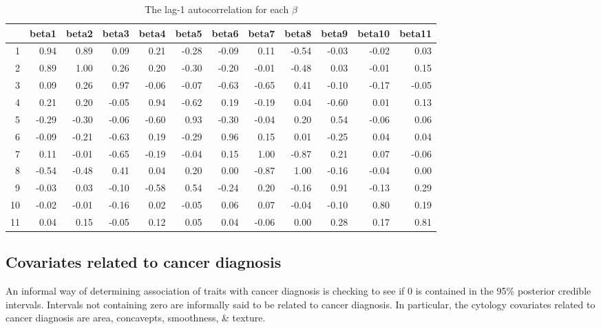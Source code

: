 \documentclass[11pt]{amsart}
\begin{document}
\begin{table}[ht]
\centering
\caption{The lag-1 autocorrelation for each $\beta$}
\begin{tabular}{rrrrrrrrrrrr}
  \hline
 & beta1 & beta2 & beta3 & beta4 & beta5 & beta6 & beta7 & beta8 & beta9 & beta10 & beta11 \\ 
  \hline
1 & 0.94 & 0.89 & 0.09 & 0.21 & -0.28 & -0.09 & 0.11 & -0.54 & -0.03 & -0.02 & 0.03 \\ 
  2 & 0.89 & 1.00 & 0.26 & 0.20 & -0.30 & -0.20 & -0.01 & -0.48 & 0.03 & -0.01 & 0.15 \\ 
  3 & 0.09 & 0.26 & 0.97 & -0.06 & -0.07 & -0.63 & -0.65 & 0.41 & -0.10 & -0.17 & -0.05 \\ 
  4 & 0.21 & 0.20 & -0.05 & 0.94 & -0.62 & 0.19 & -0.19 & 0.04 & -0.60 & 0.01 & 0.13 \\ 
  5 & -0.29 & -0.30 & -0.06 & -0.60 & 0.93 & -0.30 & -0.04 & 0.20 & 0.54 & -0.06 & 0.06 \\ 
  6 & -0.09 & -0.21 & -0.63 & 0.19 & -0.29 & 0.96 & 0.15 & 0.01 & -0.25 & 0.04 & 0.04 \\ 
  7 & 0.11 & -0.01 & -0.65 & -0.19 & -0.04 & 0.15 & 1.00 & -0.87 & 0.21 & 0.07 & -0.06 \\ 
  8 & -0.54 & -0.48 & 0.41 & 0.04 & 0.20 & 0.00 & -0.87 & 1.00 & -0.16 & -0.04 & 0.00 \\ 
  9 & -0.03 & 0.03 & -0.10 & -0.58 & 0.54 & -0.24 & 0.20 & -0.16 & 0.91 & -0.13 & 0.29 \\ 
  10 & -0.02 & -0.01 & -0.16 & 0.02 & -0.05 & 0.06 & 0.07 & -0.04 & -0.10 & 0.80 & 0.19 \\ 
  11 & 0.04 & 0.15 & -0.05 & 0.12 & 0.05 & 0.04 & -0.06 & 0.00 & 0.28 & 0.17 & 0.81 \\ 
   \hline
\end{tabular}
\end{table}

\subsection*{Covariates related to cancer diagnosis}
An informal way of determining association of traits with cancer diagnosis is checking to see if 0 is contained in the 95\% posterior credible intervals. Intervals not containing zero are informally said to be related to cancer diagnosis. In particular, the cytology covariates related to cancer diagnosis are area, concavepts, smoothness, \& texture. 
\end{document}
